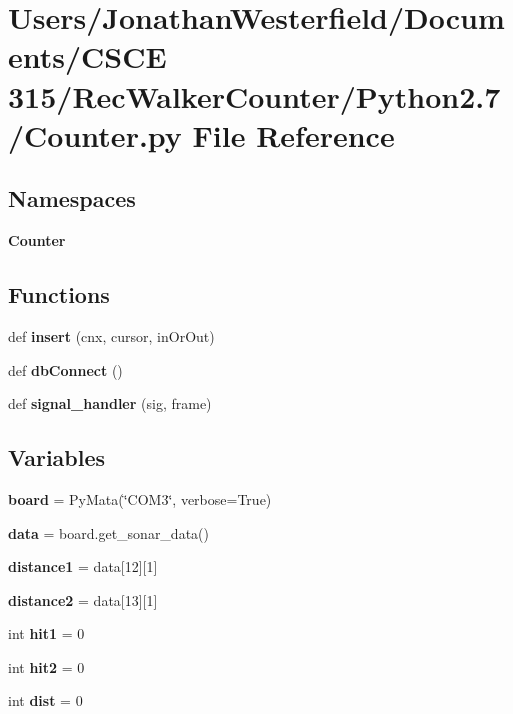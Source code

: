 \section{Users/\+Jonathan\+Westerfield/\+Documents/\+C\+S\+CE 315/\+Rec\+Walker\+Counter/\+Python2.7/\+Counter.py File Reference}
\label{_counter_8py}
\subsection*{Namespaces}
\begin{DoxyCompactItemize}
\item 
 {\bf Counter}
\end{DoxyCompactItemize}
\subsection*{Functions}
\begin{DoxyCompactItemize}
\item 
def {\bf insert} (cnx, cursor, in\+Or\+Out)
\item 
def {\bf db\+Connect} ()
\item 
def {\bf signal\+\_\+handler} (sig, frame)
\end{DoxyCompactItemize}
\subsection*{Variables}
\begin{DoxyCompactItemize}
\item 
{\bf board} = Py\+Mata(\char`\"{}C\+O\+M3\char`\"{}, verbose=True)
\item 
{\bf data} = board.\+get\+\_\+sonar\+\_\+data()
\item 
{\bf distance1} = data[12][1]
\item 
{\bf distance2} = data[13][1]
\item 
int {\bf hit1} = 0
\item 
int {\bf hit2} = 0
\item 
int {\bf dist} = 0
\end{DoxyCompactItemize}
